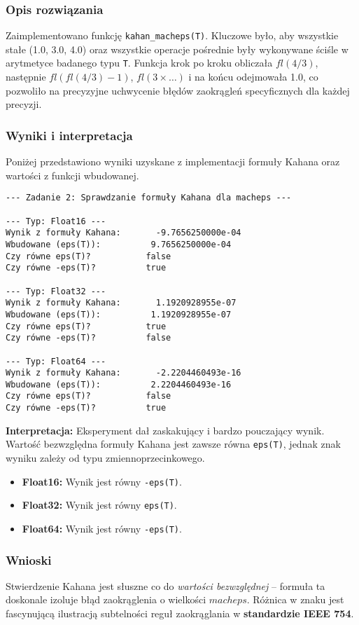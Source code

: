 \documentclass[11pt, a4paper]{article}
\begin{document}
\subsubsection{Opis rozwiązania}
Zaimplementowano funkcję \texttt{kahan\_macheps(T)}. Kluczowe było, aby wszystkie stałe (1.0, 3.0, 4.0) oraz wszystkie operacje pośrednie były wykonywane ściśle w arytmetyce badanego typu \texttt{T}. Funkcja krok po kroku obliczała $fl(4/3)$, następnie $fl(fl(4/3) - 1)$, $fl(3 \times \dots)$ i na końcu odejmowała 1.0, co pozwoliło na precyzyjne uchwycenie błędów zaokrągleń specyficznych dla każdej precyzji.

\subsubsection{Wyniki i interpretacja}
Poniżej przedstawiono wyniki uzyskane z implementacji formuły Kahana oraz wartości z funkcji wbudowanej.
\begin{verbatim}
--- Zadanie 2: Sprawdzanie formuły Kahana dla macheps ---

--- Typ: Float16 ---
Wynik z formuły Kahana:       -9.7656250000e-04
Wbudowane (eps(T)):          9.7656250000e-04
Czy równe eps(T)?           false
Czy równe -eps(T)?          true

--- Typ: Float32 ---
Wynik z formuły Kahana:       1.1920928955e-07
Wbudowane (eps(T)):          1.1920928955e-07
Czy równe eps(T)?           true
Czy równe -eps(T)?          false

--- Typ: Float64 ---
Wynik z formuły Kahana:       -2.2204460493e-16
Wbudowane (eps(T)):          2.2204460493e-16
Czy równe eps(T)?           false
Czy równe -eps(T)?          true

\end{verbatim}

\noindent \textbf{Interpretacja:}
Eksperyment dał zaskakujący i bardzo pouczający wynik. Wartość bezwzględna formuły Kahana jest zawsze równa \texttt{eps(T)}, jednak znak wyniku zależy od typu zmiennoprzecinkowego.
\begin{itemize}
    \item \textbf{Float16:} Wynik jest równy \texttt{-eps(T)}.
    \item \textbf{Float32:} Wynik jest równy \texttt{eps(T)}.
    \item \textbf{Float64:} Wynik jest równy \texttt{-eps(T)}.
\end{itemize}

\subsubsection{Wnioski}
Stwierdzenie Kahana jest słuszne co do \textit{wartości bezwzględnej} – formuła ta doskonale izoluje błąd zaokrąglenia o wielkości $macheps$. Różnica w znaku jest fascynującą ilustracją subtelności reguł zaokrąglania w \textbf{standardzie IEEE 754}.
\end{document}
